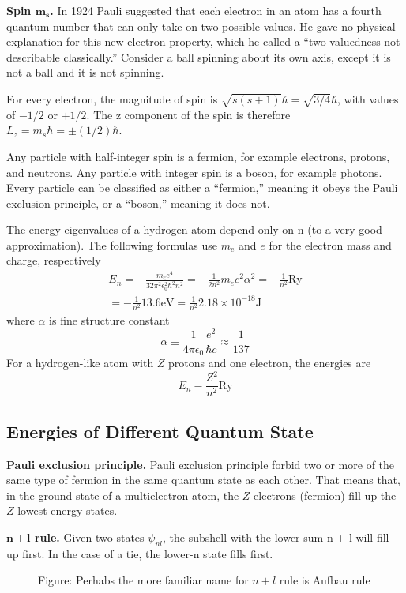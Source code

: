 \documentclass[../../main.tex]{subfiles}
\begin{document}
\textbf{Spin $\boldsymbol{m_s}$.} In 1924 Pauli suggested that each electron in an atom has a fourth quantum number that can only take on two possible values. He gave no physical explanation for this new electron property, which he called a “two-valuedness not describable classically.” Consider a ball spinning about its own axis, except it is not a ball and it is not spinning.

For every electron, the magnitude of spin is $\sqrt{s(s + 1)}\hbar=\sqrt{3/4}\hbar$, with values of $-1/2$ or $+1/2$. The z component of the spin is therefore $L_z= m_s\hbar=\pm(1/2)\hbar$.

Any particle with half-integer spin is a fermion, for example electrons, protons, and neutrons. Any particle with integer spin is a boson, for example photons. Every particle can be classified as either a “fermion,” meaning it obeys the Pauli exclusion principle, or a “boson,” meaning it does not. 

The energy eigenvalues of a hydrogen atom depend only on n (to a very good approximation). The  following formulas use $m_e$ and $e$ for the electron mass and charge, respectively
\begin{multline*}
    E_n=-\frac{m_ee^4}{32\pi^2\epsilon_0^2
    \hbar^2n^2}=-\frac{1}{2n^2}m_ec^2\alpha^2 = -\frac{1}{n^2}\text{Ry}\\
    = -\frac{1}{n^2}13.6 \text{eV}=\frac{1}{n^2}2.18\times 10^{-18}\text{J}
\end{multline*}
where $\alpha$ is fine structure constant
\begin{equation*}
    \alpha \equiv \frac{1}{4\pi\epsilon_0}\frac{e^2}{\hbar c}\approx \frac{1}{137}
\end{equation*}
For a hydrogen-like atom with $Z$ protons and one electron, the energies are
\begin{equation*}
    E_n-\frac{Z^2}{n^2}\text{Ry}
\end{equation*}

\subsection{Energies of Different Quantum State}
\textbf{Pauli exclusion principle.} Pauli exclusion principle forbid two or more of the same type of fermion in the same quantum state as each other. That means that, in the ground state of a multielectron atom, the $Z$ electrons (fermion) fill up the $Z$ lowest-energy states.

\textbf{$\boldsymbol{n + l}$ rule.} Given two states $\psi_{nl}$, the subshell with the lower sum n + l will fill up first. In the case of a tie, the lower-n state fills first.
\begin{figure}
    \centering
    \caption*{Figure: Perhabs the more familiar name for $n+l$ rule is Aufbau rule}
\end{figure}
\end{document}

